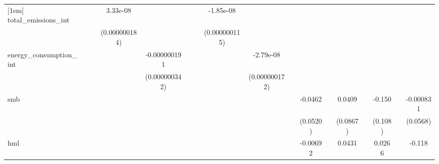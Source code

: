\begin{table}[htbp]
\begin{tabular}{l*{16}{c}}
[1em]
total\_emissions\_int &                     &                     &    3.33e-08         &                     &                     &                     &   -1.85e-08         &                     &                     &                     &                     &                     &                     &                     &                     &                     \\
                    &                     &                     &(0.000000184)         &                     &                     &                     &(0.000000115)         &                     &                     &                     &                     &                     &                     &                     &                     &                     \\
[1em]
energy\_consumption\_int&                     &                     &                     &-0.000000191         &                     &                     &                     &   -2.79e-08         &                     &                     &                     &                     &                     &                     &                     &                     \\
                    &                     &                     &                     &(0.000000342)         &                     &                     &                     &(0.000000172)         &                     &                     &                     &                     &                     &                     &                     &                     \\
[1em]
smb                 &                     &                     &                     &                     &                     &                     &                     &                     &                     &     -0.0462         &                     &      0.0409         &                     &      -0.150         &                     &   -0.000831         \\
                    &                     &                     &                     &                     &                     &                     &                     &                     &                     &    (0.0520)         &                     &    (0.0867)         &                     &     (0.108)         &                     &    (0.0568)         \\
[1em]
hml                 &                     &                     &                     &                     &                     &                     &                     &                     &                     &    -0.00692         &                     &      0.0431         &                     &      0.0266         &                     &      -0.118         \\

\end{tabular}
\end{table}
